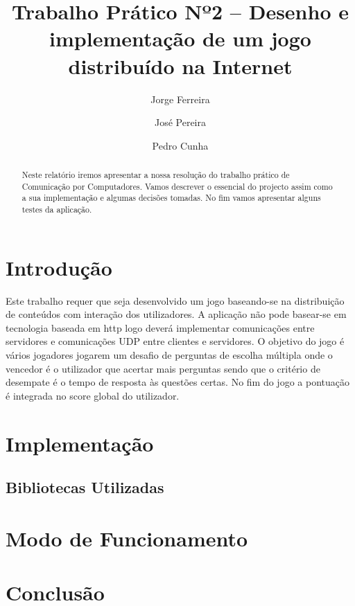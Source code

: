 \documentclass{llncs}
\begin{document}
\title{Trabalho Prático Nº2 – Desenho e implementação de um jogo distribuído na Internet}
\author{Jorge Ferreira \and José Pereira \and  Pedro Cunha}
\maketitle

\begin{abstract}
Neste relatório iremos apresentar a nossa resolução do trabalho prático de Comunicação por Computadores.
Vamos descrever o essencial do projecto assim como a sua implementação e algumas decisões tomadas. No fim vamos apresentar alguns testes da aplicação.
\end{abstract}

\section{Introdução}
Este trabalho requer que seja desenvolvido um jogo baseando-se na distribuição de conteúdos com interação dos utilizadores. A aplicação não pode basear-se em tecnologia baseada em http logo deverá implementar comunicações entre servidores e comunicações UDP entre clientes e servidores. O objetivo do jogo é vários jogadores jogarem um desafio de perguntas de escolha múltipla onde o vencedor é o utilizador que acertar mais perguntas sendo que o critério de desempate é o tempo de resposta às questões certas. No fim do jogo a pontuação é integrada no score global do utilizador.

\section{Implementação}
\subsection{Bibliotecas Utilizadas}
\section{Modo de Funcionamento}
\section{Conclusão}
\end{document}
